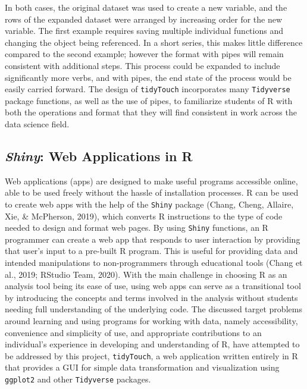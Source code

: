 \documentclass[english,man,floatsintext]{apa6}
\begin{document}
In both cases, the original dataset was used to create a new variable, and the rows of the expanded dataset were arranged by increasing order for the new variable. The first example requires saving multiple individual functions and changing the object being referenced. In a short series, this makes little difference compared to the second example; however the format with pipes will remain consistent with additional steps. This process could be expanded to include significantly more verbs, and with pipes, the end state of the process would be easily carried forward. The design of \texttt{tidyTouch} incorporates many \texttt{Tidyverse} package functions, as well as the use of pipes, to familiarize students of R with both the operations and format that they will find consistent in work across the data science field.

\hypertarget{shiny-web-applications-in-r}{%
\subsection{\texorpdfstring{\emph{Shiny}: Web Applications in R}{Shiny: Web Applications in R}}\label{shiny-web-applications-in-r}}

Web applications (apps) are designed to make useful programs accessible online, able to be used freely without the hassle of installation processes. R can be used to create web apps with the help of the \texttt{Shiny} package (Chang, Cheng, Allaire, Xie, \& McPherson, 2019), which converts R instructions to the type of code needed to design and format web pages. By using \texttt{Shiny} functions, an R programmer can create a web app that responds to user interaction by providing that user's input to a pre-built R program. This is useful for providing data and intended manipulations to non-programmers through educational tools (Chang et al., 2019; RStudio Team, 2020). With the main challenge in choosing R as an analysis tool being its ease of use, using web apps can serve as a transitional tool by introducing the concepts and terms involved in the analysis without students needing full understanding of the underlying code. The discussed target problems around learning and using programs for working with data, namely accessibility, convenience and simplicity of use, and appropriate contributions to an individual's experience in developing and understanding of R, have attempted to be addressed by this project, \texttt{tidyTouch}, a web application written entirely in R that provides a GUI for simple data transformation and visualization using \texttt{ggplot2} and other \texttt{Tidyverse} packages.
\end{document}

